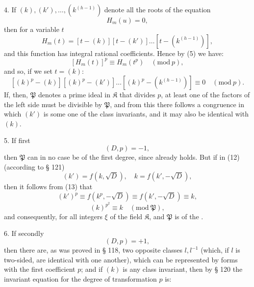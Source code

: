 4. If $(k), (k'), \ldots, (k^{(h-1)})$ denote all the roots of the
equation
\[
H_m(u) = 0,
\]
then for a variable $t$
\[
H_m(t) = [t - (k)] [t - (k')] \ldots [t - (k^{(h-1)})],
\]
and this function has integral rational coefficients. Hence by (5)
we have:
\[
[H_m(t)]^p \equiv H_m(t^p) \quad (\mathrm{mod}\ p),
\]
and so, if we set $t = (k)$:
\[
[(k)^p - (k)] [(k)^p - (k')] \ldots [(k)^p - (k^{(h-1)})] \equiv 0 \quad (\mathrm{mod}\ p).
\]
If, then, $\mathfrak P$ denotes a prime ideal in $\mathfrak K$ that divides $p$,
at least one of the factors of the left side must be divisible by
$\mathfrak P$, and from this there follows a congruence
in which $(k')$ is some one of the class invariants, and it may also
be identical with $(k)$.

5. If first
\[
(D, p) = -1,
\]
then $\mathfrak P$ can in no case be of the first degree, since already
holds. But if in (12) (according to § 121)
\[
(k') = f(k, \sqrt{D}), \quad k = f(k', -\sqrt{D}),
\]
then it follows from (13) that
\[
(k')^p \equiv f(k^p, -\sqrt{D}) \equiv f(k', -\sqrt{D}) \equiv k,
\]
\[
(k)^{p^2} \equiv k \quad (\mathrm{mod}\ \mathfrak P),
\]
and consequently, for all integers $\xi$ of the field $\mathfrak K$,
and $\mathfrak P$ is of the .

6. If secondly
\[
(D, p) = +1,
\]
then there are, as was proved in § 118, two opposite classes
$l, l^{-1}$ (which, if $l$ is two-sided, are identical with one another),
which can be represented by forms with the first coefficient $p$;
and if $(k)$ is any class invariant, then by § 120 the invariant
equation for the degree of transformation $p$ is:

